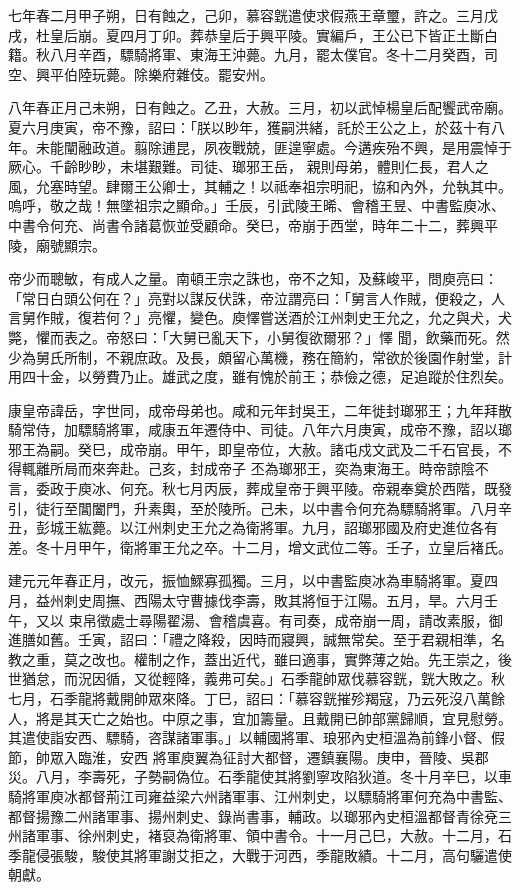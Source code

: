 \begin{pinyinscope}
 七年春二月甲子朔，日有蝕之，己卯，慕容皝遣使求假燕王章璽，許之。三月戊戌，杜皇后崩。夏四月丁卯。葬恭皇后于興平陵。實編戶，王公已下皆正土斷白籍。秋八月辛酉，驃騎將軍、東海王沖薨。九月，罷太僕官。冬十二月癸酉，司空、興平伯陸玩薨。除樂府雜伎。罷安州。



 八年春正月己未朔，日有蝕之。乙丑，大赦。三月，初以武悼楊皇后配饗武帝廟。夏六月庚寅，帝不豫，詔曰：「朕以眇年，獲嗣洪緒，託於王公之上，於茲十有八年。未能闡融政道。翦除逋昆，夙夜戰兢，匪遑寧處。今遘疾殆不興，是用震悼于厥心。千齡眇眇，未堪艱難。司徒、瑯邪王岳，
 親則母弟，體則仁長，君人之風，允塞時望。肆爾王公卿士，其輔之！以祗奉祖宗明祀，協和內外，允執其中。嗚呼，敬之哉！無墜祖宗之顯命。」壬辰，引武陵王晞、會稽王昱、中書監庾冰、中書令何充、尚書令諸葛恢並受顧命。癸巳，帝崩于西堂，時年二十二，葬興平陵，廟號顯宗。



 帝少而聰敏，有成人之量。南頓王宗之誅也，帝不之知，及蘇峻平，問庾亮曰：「常日白頭公何在？」亮對以謀反伏誅，帝泣謂亮曰：「舅言人作賊，便殺之，人言舅作賊，復若何？」亮懼，變色。庾懌嘗送酒於江州刺史王允之，允之與犬，犬斃，懼而表之。帝怒曰：「大舅已亂天下，小舅復欲爾邪？」懌
 聞，飲藥而死。然少為舅氏所制，不親庶政。及長，頗留心萬機，務在簡約，常欲於後園作射堂，計用四十金，以勞費乃止。雄武之度，雖有愧於前王；恭儉之德，足追蹤於住烈矣。



 康皇帝諱岳，字世同，成帝母弟也。咸和元年封吳王，二年徙封瑯邪王；九年拜散騎常侍，加驃騎將軍，咸康五年遷侍中、司徒。八年六月庚寅，成帝不豫，詔以瑯邪王為嗣。癸巳，成帝崩。甲午，即皇帝位，大赦。諸屯戍文武及二千石官長，不得輒離所局而來奔赴。己亥，封成帝子
 丕為瑯邪王，奕為東海王。時帝諒陰不言，委政于庾冰、何充。秋七月丙辰，葬成皇帝于興平陵。帝親奉奠於西階，既發引，徒行至閶闔門，升素輿，至於陵所。己未，以中書令何充為驃騎將軍。八月辛丑，彭城王紘薨。以江州刺史王允之為衛將軍。九月，詔瑯邪國及府史進位各有差。冬十月甲午，衛將軍王允之卒。十二月，增文武位二等。壬子，立皇后褚氏。



 建元元年春正月，改元，振恤鰥寡孤獨。三月，以中書監庾冰為車騎將軍。夏四月，益州刺史周撫、西陽太守曹據伐李壽，敗其將恒于江陽。五月，旱。六月壬午，又以
 束帛徵處士尋陽翟湯、會稽虞喜。有司奏，成帝崩一周，請改素服，御進膳如舊。壬寅，詔曰：「禮之降殺，因時而寢興，誠無常矣。至于君親相準，名教之重，莫之改也。權制之作，蓋出近代，雖曰適事，實弊薄之始。先王崇之，後世猶怠，而況因循，又從輕降，義弗可矣。」石季龍帥眾伐慕容皝，皝大敗之。秋七月，石季龍將戴開帥眾來降。丁巳，詔曰：「慕容皝摧殄羯寇，乃云死沒八萬餘人，將是其天亡之始也。中原之事，宜加籌量。且戴開已帥部黨歸順，宜見慰勞。其遣使詣安西、驃騎，咨謀諸軍事。」以輔國將軍、琅邪內史桓溫為前鋒小督、假節，帥眾入臨淮，安西
 將軍庾翼為征討大都督，遷鎮襄陽。庚申，晉陵、吳郡災。八月，李壽死，子勢嗣偽位。石季龍使其將劉寧攻陷狄道。冬十月辛巳，以車騎將軍庾冰都督荊江司雍益梁六州諸軍事、江州刺史，以驃騎將軍何充為中書監、都督揚豫二州諸軍事、揚州刺史、錄尚書事，輔政。以瑯邪內史桓溫都督青徐兗三州諸軍事、徐州刺史，褚裒為衛將軍、領中書令。十一月己巳，大赦。十二月，石季龍侵張駿，駿使其將軍謝艾拒之，大戰于河西，季龍敗績。十二月，高句驪遣使朝獻。




\end{pinyinscope}
